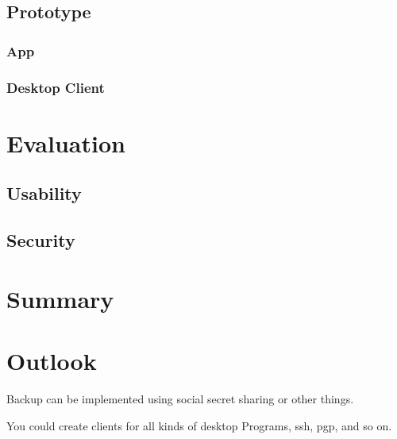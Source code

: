 \documentclass[12pt,twoside,a4paper,parskip]{scrbook}
\begin{document}
\section{Prototype}

\subsection{App}

\subsection{Desktop Client}



\chapter{Evaluation}

\section{Usability}

\section{Security}



\chapter{Summary}

\chapter{Outlook}

Backup can be implemented using social secret sharing or other things.

You could create clients for all kinds of desktop Programs, ssh, pgp, and so on.
\end{document}
